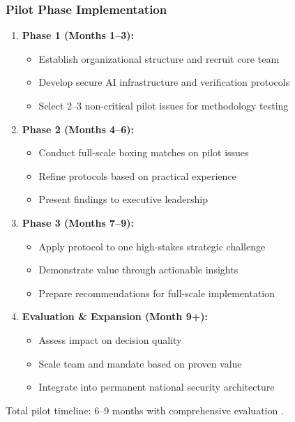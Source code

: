 \documentclass[11pt,a4paper]{article}
\begin{document}
\subsubsection{Pilot Phase Implementation}
\begin{enumerate}
    \item \textbf{Phase 1 (Months 1--3):} 
    \begin{itemize}[nosep]
        \item Establish organizational structure and recruit core team
        \item Develop secure AI infrastructure and verification protocols
        \item Select 2--3 non-critical pilot issues for methodology testing
    \end{itemize}
    
    \item \textbf{Phase 2 (Months 4--6):}
    \begin{itemize}[nosep]
        \item Conduct full-scale boxing matches on pilot issues
        \item Refine protocols based on practical experience
        \item Present findings to executive leadership
    \end{itemize}
    
    \item \textbf{Phase 3 (Months 7--9):}
    \begin{itemize}[nosep]
        \item Apply protocol to one high-stakes strategic challenge
        \item Demonstrate value through actionable insights
        \item Prepare recommendations for full-scale implementation
    \end{itemize}
    
    \item \textbf{Evaluation \& Expansion (Month 9+):}
    \begin{itemize}[nosep]
        \item Assess impact on decision quality
        \item Scale team and mandate based on proven value
        \item Integrate into permanent national security architecture
    \end{itemize}
\end{enumerate}

Total pilot timeline: 6--9 months with comprehensive evaluation \citep[lines 1199, 1341]{AnalyticalReport2025}.
\end{document}
